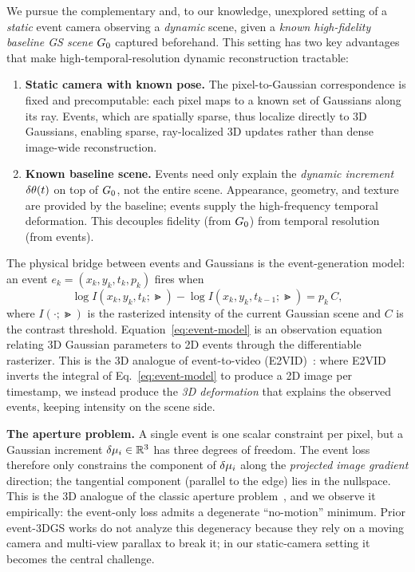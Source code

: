 We pursue the complementary and, to our knowledge, unexplored setting of a \emph{static} event camera observing a \emph{dynamic} scene, given a \emph{known high-fidelity baseline GS scene} $G_0$ captured beforehand. This setting has two key advantages that make high-temporal-resolution dynamic reconstruction tractable:
\begin{enumerate}[leftmargin=*,topsep=2pt,itemsep=1pt]
  \item \textbf{Static camera with known pose.} The pixel-to-Gaussian correspondence is fixed and precomputable: each pixel maps to a known set of Gaussians along its ray. Events, which are spatially sparse, thus localize directly to 3D Gaussians, enabling sparse, ray-localized 3D updates rather than dense image-wide reconstruction.
  \item \textbf{Known baseline scene.} Events need only explain the \emph{dynamic increment} $\delta\theta(t)$ on top of $G_0$, not the entire scene. Appearance, geometry, and texture are provided by the baseline; events supply the high-frequency temporal deformation. This decouples fidelity (from $G_0$) from temporal resolution (from events).
\end{enumerate}

The physical bridge between events and Gaussians is the event-generation model: an event $e_k=(x_k,y_k,t_k,p_k)$ fires when
\begin{equation}
  \log I(x_k,y_k,t_k;\Gt) - \log I(x_k,y_k,t_{k-1};\Gt) = p_k\, C,
  \label{eq:event-model}
\end{equation}
where $I(\cdot;\Gt)$ is the rasterized intensity of the current Gaussian scene and $C$ is the contrast threshold. Equation~\ref{eq:event-model} is an observation equation relating 3D Gaussian parameters to 2D events through the differentiable rasterizer. This is the 3D analogue of event-to-video (E2VID)~\cite{rebecq2019e2vid}: where E2VID inverts the integral of Eq.~\ref{eq:event-model} to produce a 2D image per timestamp, we instead produce the \emph{3D deformation} that explains the observed events, keeping intensity on the scene side.

\medskip\noindent\textbf{The aperture problem.} A single event is one scalar constraint per pixel, but a Gaussian increment $\delta\mu_i\in\mathbb{R}^3$ has three degrees of freedom. The event loss therefore only constrains the component of $\delta\mu_i$ along the \emph{projected image gradient} direction; the tangential component (parallel to the edge) lies in the nullspace. This is the 3D analogue of the classic aperture problem~\cite{gallego2018contrast,barron1994aperture}, and we observe it empirically: the event-only loss admits a degenerate ``no-motion'' minimum. Prior event-3DGS works do not analyze this degeneracy because they rely on a moving camera and multi-view parallax to break it; in our static-camera setting it becomes the central challenge.


